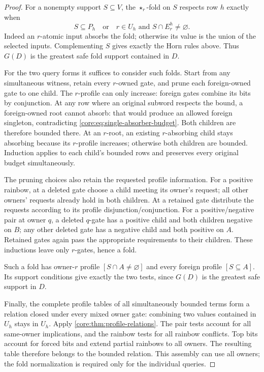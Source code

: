 \begin{proof}
For a nonempty support $S\subseteq V$, the $\star_r$-fold on $S$
respects row $h$ exactly when
\[
 S\subseteq P_h
 \quad\text{or}\quad
 r\in U_h\text{ and }S\cap E_r^h\ne\varnothing.
\]
Indeed an $r$-atomic input absorbs the fold; otherwise its value is the
union of the selected inputs. Complementing $S$ gives exactly the Horn
rules above. Thus $G(D)$ is the greatest safe fold support contained
in $D$.

For the two query forms it suffices to consider such folds. Start from
any simultaneous witness, retain every $r$-owned gate, and prune each
foreign-owned gate to one child. The $r$-profile can only increase:
foreign gates combine its bits by conjunction. At any row where an
original subword respects the bound, a foreign-owned root cannot
absorb: that would produce an allowed foreign singleton, contradicting
\eqref{core:eq:single-absorber-budget}. Both children are therefore
bounded there. At an $r$-root, an existing $r$-absorbing child stays
absorbing because its $r$-profile increases; otherwise both children
are bounded. Induction applies to each child's bounded rows and
preserves every original budget simultaneously.

The pruning choices also retain the requested profile information.
For a positive rainbow, at a deleted gate choose a child meeting its
owner's request; all other owners' requests already hold in both
children. At a retained gate distribute the requests according to
its profile disjunction/conjunction. For a positive/negative pair at
owner $q$, a deleted $q$-gate has a positive child and both children
negative on $B$; any other deleted gate has a negative child and both
positive on $A$. Retained gates again pass the appropriate requirements
to their children. These inductions leave only $r$-gates, hence a fold.

Such a fold has owner-$r$ profile $[S\cap A\ne\varnothing]$ and every
foreign profile $[S\subseteq A]$. Its support conditions give exactly
the two tests, since $G(D)$ is the greatest safe support in $D$.

Finally, the complete profile tables of all simultaneously bounded
terms form a relation closed under every mixed owner gate: combining
two values contained in $U_h$ stays in $U_h$. Apply
\cref{core:thm:profile-relations}. The pair tests account for all
same-owner implications, and the rainbow tests for all rainbow
conflicts. Top bits account for forced bits and extend partial
rainbows to all owners. The resulting table therefore belongs to
the bounded relation. This assembly can use all owners; the fold
normalization is required only for the individual queries.
\end{proof}

